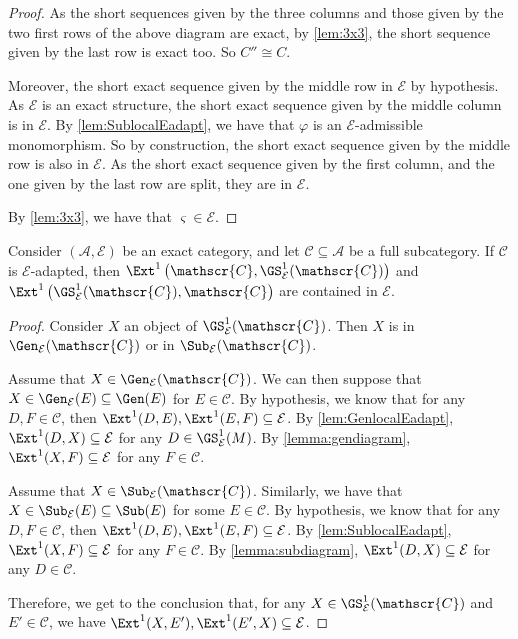 \begin{proof}
As the short sequences given by the three columns and those given by the two first rows of the above diagram are exact, by \cref{lem:3x3}, the short sequence given by the last row is exact too. So $C'' \cong C$. 

Moreover, the short exact sequence given by the middle row in $\mathcal{E}$ by hypothesis. As $\mathcal{E}$ is an exact structure, the short exact sequence given by the middle column is in $\mathcal{E}$. By \cref{lem:SublocalEadapt}, we have that $\varphi$ is an $\mathcal{E}$-admissible monomorphism. So by construction, the short exact sequence given by the middle row is also in $\mathcal{E}$. As the short exact sequence given by the first column, and the one given by the last row are split, they are in $\mathcal{E}$.

By \cref{lem:3x3}, we have that $\varsigma \in {\mathcal{E}}$. 
\end{proof}

\begin{prop}
\label{prop:Estableinduction}
Consider $(\mathscr{A}, \mathcal{E})$ be an exact category, and let $\mathscr{C} \subseteq \mathscr{A}$ be a full subcategory. If $\mathscr{C}$ is $ {\mathcal{E}}$-adapted, then $\Ext^1\left(\mathscr{C}, \GS^1_{\mathcal{E}}(\mathscr{C})\right)$ and $\Ext^1 \left(\GS^1_{\mathcal{E}}(\mathscr{C}), \mathscr{C} \right)$ are contained in ${\mathcal{E}}$.
\end{prop}

\begin{proof}
Consider $X$ an object of $\GS^1_{\mathcal{E}}(\mathscr{C})$. Then $X$ is in $\Gen_{\mathcal{E}}(\mathscr{C})$ or in $\Sub_{\mathcal{E}}(\mathscr{C})$.

Assume that $X \in \Gen_{\mathcal{E}}(\mathscr{C})$. We can then suppose that $X \in \Gen_{\mathcal{E}}(E) \subseteq \Gen(E)$ for $E \in \mathscr{C}$. By hypothesis, we know that for any $D,F\in \mathscr{C}$, then $\Ext^1(D,E),\Ext^1(E,F) \subseteq \mathcal{E}$. By \cref{lem:GenlocalEadapt}, $\Ext^1(D,X) \subseteq \mathcal{E}$ for any $D \in \GS^{1}_{\mathcal{E}}(M)$. By \cref{lemma:gendiagram}, $\Ext^1(X,F) \subseteq \mathcal{E}$ for any $F \in \mathscr{C}$.

Assume that $X \in \Sub_{\mathcal{E}}(\mathscr{C})$. Similarly, we have that $X \in \Sub_{\mathcal{E}}(E) \subseteq \Sub(E)$ for some $E \in \mathscr{C}$. By hypothesis, we know that for any $D,F \in \mathscr{C}$, then $\Ext^1(D,E),\Ext^1(E,F) \subseteq \mathcal{E}$. By \cref{lem:SublocalEadapt}, $\Ext^1(X,F) \subseteq \mathcal{E}$ for any $F \in \mathscr{C}$. By \cref{lemma:subdiagram}, $\Ext^1(D,X) \subseteq \mathcal{E}$ for any $D \in \mathscr{C}$.

Therefore, we get to the conclusion that, for any $X\in \GS^1_{\mathcal{E}}(\mathscr{C})$ and $E' \in \mathscr{C}$, we have $\Ext^1(X,E'),\Ext^1(E',X)\subseteq \mathcal{E}$.
\end{proof}

